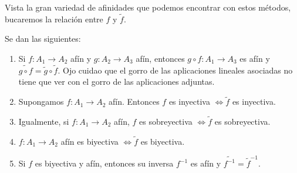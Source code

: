 \documentclass[14pt]{book}
\begin{document}
Vista la gran variedad de afinidades que podemos encontrar con estos métodos, bucaremos la relación entre $f$ y $\tilde{f}$.

\begin{tm}
	Se dan las siguientes:
	\begin{enumerate}
		\item Si $f: A_1 \to A_2$ afín y $g : A_2 \to A_3$ afín, entonces $g \circ f : A_1 \to A_3$ es afín y $\widetilde{g \circ f} = \tilde{g} \circ \tilde{f}$. Ojo cuidao que el gorro de las aplicaciones lineales asociadas no tiene que ver con el gorro de las aplicaciones adjuntas.
		\item Supongamos $f: A_1 \to A_2$ afín. Entonces $f$ es inyectiva $\iff \tilde{f}$ es inyectiva.
		\item Igualmente, si $f: A_1 \to A_2$ afín, $f$ es sobreyectiva $\iff \tilde{f}$ es sobreyectiva.
		\item $f: A_1 \to A_2$ afín es biyectiva $\iff \tilde{f}$ es biyectiva.
		\item Si $f$ es biyectiva y afín, entonces su inversa $f^{-1}$ es afín y $\widetilde{f^{-1}} = \tilde{f}^{-1}$.
	\end{enumerate}
\end{tm}
\end{document}
